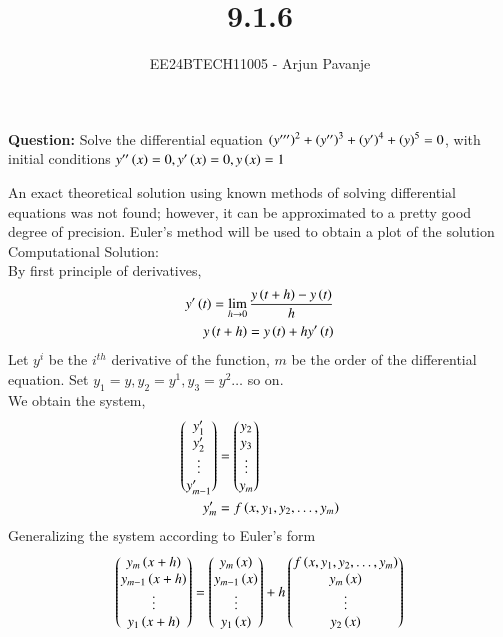 \documentclass[journal]{IEEEtran}
\begin{document}

\vspace{3cm}

\title{9.1.6}
\author{EE24BTECH11005 - Arjun Pavanje}
{\let\newpage\relax\maketitle}
\textbf{Question:}
Solve the differential equation $\left(y^{\prime \prime \prime}\right)^2 + \left(y^{\prime \prime}\right)^3 + \left(y^{\prime}\right)^4 + \left(y\right)^5 = 0$, with initial conditions $y^{\prime \prime}\left(x\right)=0, y^{\prime}\left(x\right)=0, y\left(x\right)=1$

\solution
An exact theoretical solution using known methods of solving differential equations was not found; however, it can be approximated to a pretty good degree of precision. Euler's method will be used to obtain a plot of the solution\\

Computational Solution:\\
By first principle of derivatives,
\begin{align}
    y^{\prime}\left(t\right) = \lim_{h\to 0}\frac{y\left(t+h\right) - y\left(t\right)}{h}\\
    y\left(t+h\right) = y\left(t\right) + hy^{\prime}\left(t\right)
\end{align}
Let $y^{i}$ be the $i^{th}$ derivative of the function, $m$ be the order of the differential equation. Set $y_1=y, y_2=y^{1}, y_3=y^{2} \dots$ so on.\\
We obtain the system,
\begin{align}
    \begin{pmatrix}y_1^{\prime} \\ y_2^{\prime} \\ \vdots \\ y_{m-1}^{\prime} \end{pmatrix}&=\begin{pmatrix}y_2 \\ y_3 \\ \vdots \\ y_m\end{pmatrix}\\
y_m^{\prime}&=f\left(x, y_1, y_2, \dots, y_m\right)
\end{align}
Generalizing the system according to Euler's form\\
\begin{align}
    \begin{pmatrix}y_m\left(x+h\right) \\ y_{m-1}\left(x+h\right) \\ \vdots \\ y_1\left(x+h\right)\end{pmatrix} = \begin{pmatrix}y_m\left(x\right) \\ y_{m-1}\left(x\right) \\ \vdots \\ y_1\left(x\right)\end{pmatrix} + h\begin{pmatrix}f\left(x, y_1, y_2, \dots, y_m\right) \\ y_m\left(x\right) \\ \vdots \\ y_2\left(x\right)\end{pmatrix}
\end{align}
\end{document}
